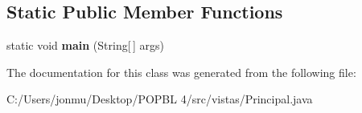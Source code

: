\subsection*{Static Public Member Functions}
\begin{DoxyCompactItemize}
\item 
\mbox{\label{classvistas_1_1_principal_a626dbf26bfdd3a03a2c1c99e34d25b6c}} 
static void {\bfseries main} (String\mbox{[}$\,$\mbox{]} args)
\end{DoxyCompactItemize}


The documentation for this class was generated from the following file\+:\begin{DoxyCompactItemize}
\item 
C\+:/\+Users/jonmu/\+Desktop/\+P\+O\+P\+B\+L 4/src/vistas/Principal.\+java\end{DoxyCompactItemize}
